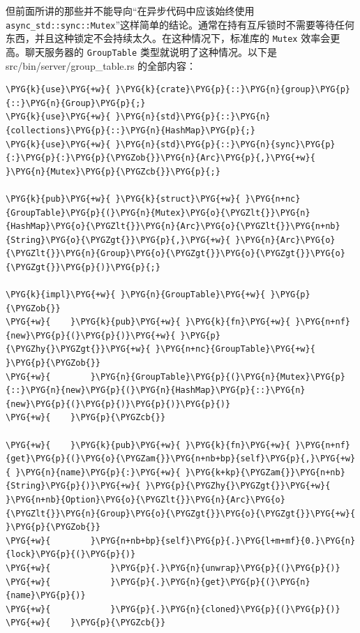 但前面所讲的那些并不能导向“在异步代码中应该始终使用 \texttt{async\_std::sync::Mutex}”这样简单的结论。通常在持有互斥锁时不需要等待任何东西，并且这种锁定不会持续太久。在这种情况下，标准库的 \texttt{Mutex} 效率会更高。聊天服务器的 \texttt{GroupTable} 类型就说明了这种情况。以下是 src/bin/server/\allowbreak{}group\_table.rs 的全部内容：

\begin{Verbatim}[commandchars=\\\{\},breaklines=true,breakanywhere=true,fontsize=\codefont,xleftmargin=17bp]
\PYG{k}{use}\PYG{+w}{ }\PYG{k}{crate}\PYG{p}{::}\PYG{n}{group}\PYG{p}{::}\PYG{n}{Group}\PYG{p}{;}
\PYG{k}{use}\PYG{+w}{ }\PYG{n}{std}\PYG{p}{::}\PYG{n}{collections}\PYG{p}{::}\PYG{n}{HashMap}\PYG{p}{;}
\PYG{k}{use}\PYG{+w}{ }\PYG{n}{std}\PYG{p}{::}\PYG{n}{sync}\PYG{p}{:}\PYG{p}{:}\PYG{p}{\PYGZob{}}\PYG{n}{Arc}\PYG{p}{,}\PYG{+w}{ }\PYG{n}{Mutex}\PYG{p}{\PYGZcb{}}\PYG{p}{;}

\PYG{k}{pub}\PYG{+w}{ }\PYG{k}{struct}\PYG{+w}{ }\PYG{n+nc}{GroupTable}\PYG{p}{(}\PYG{n}{Mutex}\PYG{o}{\PYGZlt{}}\PYG{n}{HashMap}\PYG{o}{\PYGZlt{}}\PYG{n}{Arc}\PYG{o}{\PYGZlt{}}\PYG{n+nb}{String}\PYG{o}{\PYGZgt{}}\PYG{p}{,}\PYG{+w}{ }\PYG{n}{Arc}\PYG{o}{\PYGZlt{}}\PYG{n}{Group}\PYG{o}{\PYGZgt{}}\PYG{o}{\PYGZgt{}}\PYG{o}{\PYGZgt{}}\PYG{p}{)}\PYG{p}{;}

\PYG{k}{impl}\PYG{+w}{ }\PYG{n}{GroupTable}\PYG{+w}{ }\PYG{p}{\PYGZob{}}
\PYG{+w}{    }\PYG{k}{pub}\PYG{+w}{ }\PYG{k}{fn}\PYG{+w}{ }\PYG{n+nf}{new}\PYG{p}{(}\PYG{p}{)}\PYG{+w}{ }\PYG{p}{\PYGZhy{}\PYGZgt{}}\PYG{+w}{ }\PYG{n+nc}{GroupTable}\PYG{+w}{ }\PYG{p}{\PYGZob{}}
\PYG{+w}{        }\PYG{n}{GroupTable}\PYG{p}{(}\PYG{n}{Mutex}\PYG{p}{::}\PYG{n}{new}\PYG{p}{(}\PYG{n}{HashMap}\PYG{p}{::}\PYG{n}{new}\PYG{p}{(}\PYG{p}{)}\PYG{p}{)}\PYG{p}{)}
\PYG{+w}{    }\PYG{p}{\PYGZcb{}}

\PYG{+w}{    }\PYG{k}{pub}\PYG{+w}{ }\PYG{k}{fn}\PYG{+w}{ }\PYG{n+nf}{get}\PYG{p}{(}\PYG{o}{\PYGZam{}}\PYG{n+nb+bp}{self}\PYG{p}{,}\PYG{+w}{ }\PYG{n}{name}\PYG{p}{:}\PYG{+w}{ }\PYG{k+kp}{\PYGZam{}}\PYG{n+nb}{String}\PYG{p}{)}\PYG{+w}{ }\PYG{p}{\PYGZhy{}\PYGZgt{}}\PYG{+w}{ }\PYG{n+nb}{Option}\PYG{o}{\PYGZlt{}}\PYG{n}{Arc}\PYG{o}{\PYGZlt{}}\PYG{n}{Group}\PYG{o}{\PYGZgt{}}\PYG{o}{\PYGZgt{}}\PYG{+w}{ }\PYG{p}{\PYGZob{}}
\PYG{+w}{        }\PYG{n+nb+bp}{self}\PYG{p}{.}\PYG{l+m+mf}{0.}\PYG{n}{lock}\PYG{p}{(}\PYG{p}{)}
\PYG{+w}{            }\PYG{p}{.}\PYG{n}{unwrap}\PYG{p}{(}\PYG{p}{)}
\PYG{+w}{            }\PYG{p}{.}\PYG{n}{get}\PYG{p}{(}\PYG{n}{name}\PYG{p}{)}
\PYG{+w}{            }\PYG{p}{.}\PYG{n}{cloned}\PYG{p}{(}\PYG{p}{)}
\PYG{+w}{    }\PYG{p}{\PYGZcb{}}


\end{Verbatim}
